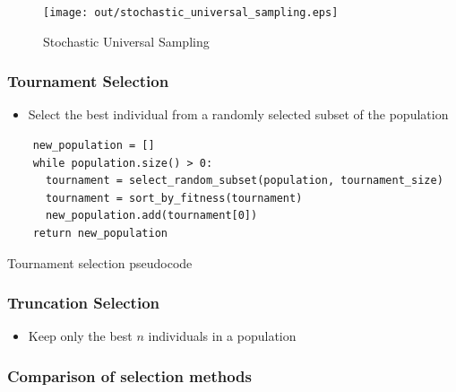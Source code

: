 \documentclass[a4paper]{article}
\begin{document}
\begin{figure}[h!]
  \centering
  \texttt{[image: out/stochastic\_universal\_sampling.eps]}
  \caption{Stochastic Universal Sampling}
  \label{fig:stochastic_universal_sampling}
\end{figure}
\FloatBarrier

\subsubsection{Tournament Selection}

\begin{itemize}
  \item Select the best individual from a randomly selected subset of the
        population
\end{itemize}

\begin{listing}[h]
  \begin{verbatim}
    new_population = []
    while population.size() > 0:
      tournament = select_random_subset(population, tournament_size)
      tournament = sort_by_fitness(tournament)
      new_population.add(tournament[0])
    return new_population
  \end{verbatim}
  \caption{Tournament selection pseudocode}
  \label{listing:ga_tournament_selection_pseudocode}
\end{listing}

\subsubsection{Truncation Selection}

\begin{itemize}
  \item Keep only the best $n$ individuals in a population
\end{itemize}

\subsubsection{Comparison of selection methods}
\end{document}
